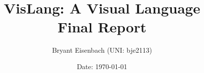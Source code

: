 \documentclass[titlepage]{article}
\title{VisLang: A Visual Language\\Final Report}
\author{Bryant Eisenbach (UNI: bje2113)}
\date{Date: \today}
\begin{document}
\maketitle
\pagebreak

\tableofcontents
\pagebreak

\listoffigures
\pagebreak

\listoftables
\pagebreak

\listoflistings
\pagebreak


\pagebreak


\pagebreak


\pagebreak


\pagebreak


\pagebreak


\pagebreak


\pagebreak


\end{document}
